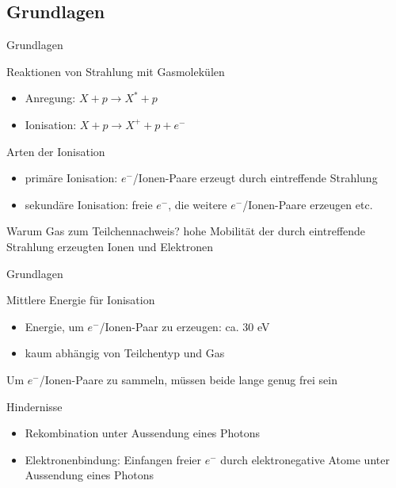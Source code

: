 \subsection{Grundlagen}

\begin{frame}{Grundlagen}
	\begin{block}{Reaktionen von Strahlung mit Gasmolekülen}
		\begin{itemize}
		  \item Anregung:	$X+p\rightarrow X^*+p$\\
		  \item Ionisation:	$X+p\rightarrow X^++p+e^-$\\
		\end{itemize}		
	\end{block}

	\begin{block}{Arten der Ionisation}
		\begin{itemize}
		  \item primäre Ionisation: $e^-$/Ionen-Paare erzeugt durch eintreffende Strahlung
		  \item sekundäre Ionisation: freie $e^-$, die weitere $e^-$/Ionen-Paare erzeugen
		  etc.
		\end{itemize}
	\end{block}	
	
	\begin{block}{Warum Gas zum Teilchennachweis?}
		 hohe Mobilität der durch eintreffende Strahlung erzeugten Ionen und Elektronen
	\end{block}
\end{frame}


\begin{frame}{Grundlagen}
	\begin{block}{Mittlere Energie für Ionisation}
		\begin{itemize}
		  \item Energie, um $e^-$/Ionen-Paar zu erzeugen: ca. 30 eV
		  \item kaum abhängig von Teilchentyp und Gas
		\end{itemize}
	\end{block}
	\vspace*{0.7cm}
	Um $e^-$/Ionen-Paare zu sammeln, müssen beide lange genug frei sein
	\begin{block}{Hindernisse}
			\begin{itemize}
		  \item Rekombination unter Aussendung eines Photons
		  \item Elektronenbindung: Einfangen freier $e^-$ durch elektronegative Atome unter Aussendung
		  eines Photons
		\end{itemize}
	\end{block}
\end{frame}


